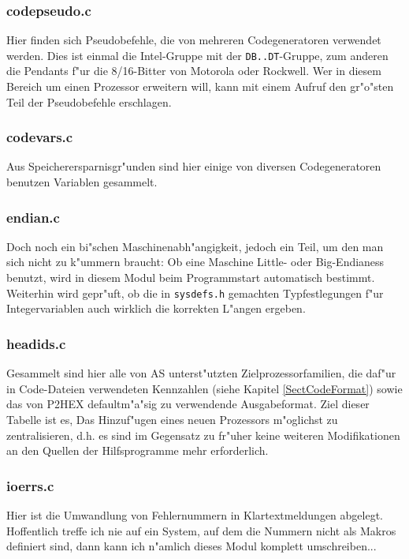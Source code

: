 \documentclass[12pt,a4paper,twoside]{report}
\newcommand{\tty}[1]{{\tt #1}}
\begin{document}
\subsubsection{codepseudo.c}

Hier finden sich Pseudobefehle, die von mehreren Codegeneratoren verwendet
werden.  Dies ist einmal die Intel-Gruppe mit der \tty{DB..DT}-Gruppe,
zum anderen die Pendants f"ur die 8/16-Bitter von Motorola oder Rockwell.
Wer in diesem Bereich um einen Prozessor erweitern will, kann mit einem
Aufruf den gr"o"sten Teil der Pseudobefehle erschlagen.

\subsubsection{codevars.c}

Aus Speicherersparnisgr"unden sind hier einige von diversen
Codegeneratoren benutzen Variablen gesammelt.

\subsubsection{endian.c}

Doch noch ein bi"schen Maschinenabh"angigkeit, jedoch ein Teil, um den man
sich nicht zu k"ummern braucht: Ob eine Maschine Little- oder
Big-Endianess benutzt, wird in diesem Modul beim Programmstart automatisch
bestimmt.  Weiterhin wird gepr"uft, ob die in {\tt sysdefs.h} gemachten
Typfestlegungen f"ur Integervariablen auch wirklich die korrekten L"angen
ergeben.

\subsubsection{headids.c}

Gesammelt sind hier alle von AS unterst"utzten Zielprozessorfamilien, die
daf"ur in Code-Dateien verwendeten Kennzahlen (siehe Kapitel
\ref{SectCodeFormat}) sowie das von P2HEX defaultm"a"sig zu verwendende
Ausgabeformat.  Ziel dieser Tabelle ist es, Das Hinzuf"ugen eines neuen
Prozessors m"oglichst zu zentralisieren, d.h. es sind im Gegensatz zu
fr"uher keine weiteren Modifikationen an den Quellen der Hilfsprogramme
mehr erforderlich.

\subsubsection{ioerrs.c}

Hier ist die Umwandlung von Fehlernummern in Klartextmeldungen abgelegt.
Hoffentlich treffe ich nie auf ein System, auf dem die Nummern nicht als
Makros definiert sind, dann kann ich n"amlich dieses Modul komplett
umschreiben...
\end{document}
